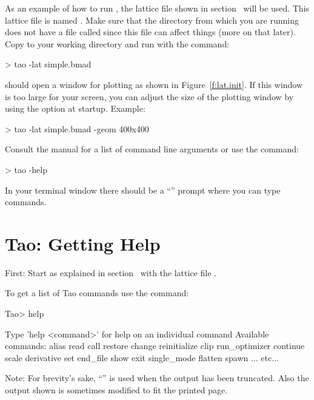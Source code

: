 \documentclass{hitec}
\newcommand{\Section}[1]{\section{#1}\vspace*{-1ex}}
\begin{document}
As an example of how to run \tao, the lattice file shown in section~ will be
used. This lattice file is named .  Make sure that the directory from which you are
running \tao does not have a file called  since this file can affect things (more on
that later). Copy  to your working directory and run \tao with the command:
\begin{code}
> tao -lat simple.bmad
\end{code}
\tao should open a window for plotting as shown in Figure~\ref{f:lat.init}. If this window is too
large for your screen, you can adjust the size of the plotting window by using the 
option at startup. Example:
\begin{code}
> tao -lat simple.bmad -geom 400x400
\end{code}
Consult the \tao manual for a list of command line arguments or use the command:
\begin{code}
> tao -help
\end{code}

In your terminal window there should be a ``'' prompt where you can type \tao commands.

\Section{Tao: Getting Help}

First: Start \tao as explained in section~ with the lattice file
.

To get a list of Tao commands use the  command:
\begin{code}
Tao> help

Type 'help <command>' for help on an individual command
Available commands:
  alias                             read
  call                              restore
  change                            reinitialize
  clip                              run_optimizer
  continue                          scale
  derivative                        set
  end_file                          show
  exit                              single_mode
  flatten                           spawn
... etc...
\end{code}

Note: For brevity's sake, ``'' is used when the output has been truncated. Also the output shown
is sometimes modified to fit the printed page.
\end{document}

